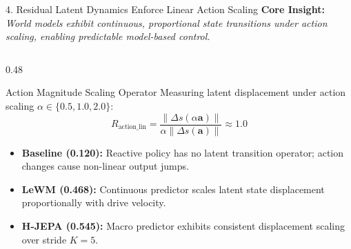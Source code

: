 \documentclass[aspectratio=169, 10pt]{beamer}
\begin{document}
\begin{frame}{4. Residual Latent Dynamics Enforce Linear Action Scaling}
  \textbf{Core Insight:} \textit{World models exhibit continuous, proportional state transitions under action scaling, enabling predictable model-based control.}

  \vspace{0.2cm}
  \begin{columns}[T]
    \begin{column}{0.48\textwidth}
      \begin{block}{Action Magnitude Scaling Operator}
        \small
        Measuring latent displacement under action scaling $\alpha \in \{0.5, 1.0, 2.0\}$:
        \begin{equation*}
          R_{\mathrm{action\_lin}} = \frac{\|\Delta s(\alpha \mathbf{a})\|}{\alpha \|\Delta s(\mathbf{a})\|} \approx 1.0
        \end{equation*}
        \begin{itemize}
          \item \textbf{Baseline (\alert{0.120}):} Reactive policy has no latent transition operator; action changes cause non-linear output jumps.
          \item \textbf{LeWM (\textbf{0.468}):} Continuous predictor scales latent state displacement proportionally with drive velocity.
          \item \textbf{H-JEPA (\textbf{0.545}):} Macro predictor exhibits consistent displacement scaling over stride $K=5$.
        \end{itemize}
      \end{block}
    \end{column}


\end{columns}
\end{frame}
\end{document}
